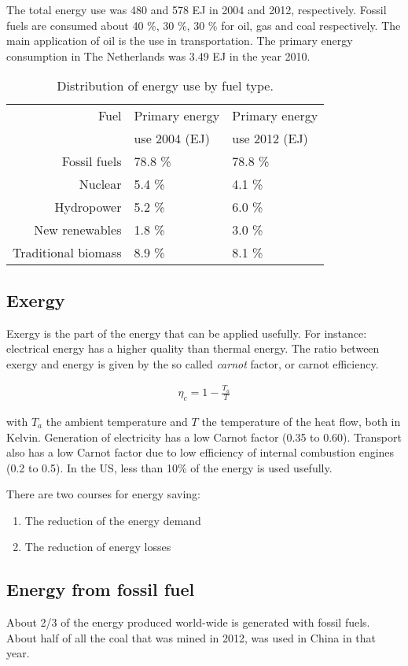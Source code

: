 \documentclass[a4paper,10pt]{article}
\begin{document}
The total energy use was 480 and 578 EJ in 2004 and 2012, respectively. Fossil fuels are consumed about 40 \%, 30 \%, 30 \% for oil, gas and coal respectively. The main application of oil is the use in transportation. The primary energy consumption in The Netherlands was 3.49 EJ in the year 2010.
\begin{table}[ht]
\centering
 \begin{tabular}{rll}
  Fuel & Primary energy & Primary energy \\
   & use 2004 (EJ) &   use 2012 (EJ)  \\ \hline
  Fossil fuels & 78.8 \% & 78.8 \% \\
  Nuclear & 5.4 \% & 4.1 \% \\
  Hydropower & 5.2 \% & 6.0 \% \\
  New renewables & 1.8 \% & 3.0 \% \\
  Traditional biomass & 8.9 \% & 8.1 \%
 \end{tabular}
\caption{Distribution of energy use by fuel type.}
\end{table}
\subsection{Exergy}
Exergy is the part of the energy that can be applied usefully. For instance: electrical energy has a higher quality than thermal energy. The ratio between exergy and energy is given by the so called \emph{carnot} factor, or carnot efficiency.

\begin{align}
 \eta_c = 1 - \frac{T_a}{T}
\end{align}

with $T_a$ the ambient temperature and $T$ the temperature of the heat flow, both in Kelvin. Generation of electricity has a low Carnot factor (0.35 to 0.60). Transport also has a low Carnot factor due to low efficiency of internal combustion engines (0.2 to 0.5). In the US, less than 10\% of the energy is used usefully.

There are two courses for energy saving:
\begin{enumerate}
 \item The reduction of the energy demand
 \item The reduction of energy losses
\end{enumerate}



\subsection{Energy from fossil fuel}
About 2/3 of the energy produced world-wide is generated with fossil fuels. About half of all the coal that was mined in 2012, was used in China in that year. \bigskip
\end{document}
